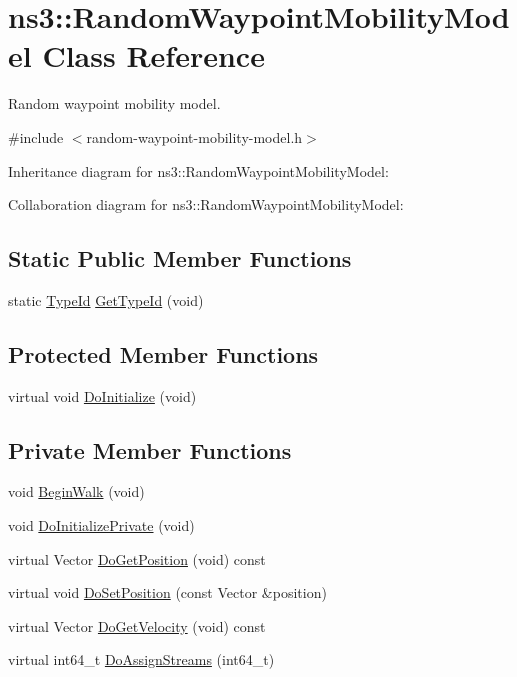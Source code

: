 \hypertarget{classns3_1_1RandomWaypointMobilityModel}{}\section{ns3\+:\+:Random\+Waypoint\+Mobility\+Model Class Reference}
\label{classns3_1_1RandomWaypointMobilityModel}


Random waypoint mobility model.  




{\ttfamily \#include $<$random-\/waypoint-\/mobility-\/model.\+h$>$}



Inheritance diagram for ns3\+:\+:Random\+Waypoint\+Mobility\+Model\+:


Collaboration diagram for ns3\+:\+:Random\+Waypoint\+Mobility\+Model\+:
\subsection*{Static Public Member Functions}
\begin{DoxyCompactItemize}
\item 
static \hyperlink{classns3_1_1TypeId}{Type\+Id} \hyperlink{classns3_1_1RandomWaypointMobilityModel_ac5dd2a5c630655400f1a0f49c91f2dbc}{Get\+Type\+Id} (void)
\end{DoxyCompactItemize}
\subsection*{Protected Member Functions}
\begin{DoxyCompactItemize}
\item 
virtual void \hyperlink{classns3_1_1RandomWaypointMobilityModel_ab3c24223f92f3b81d9b9b3d916e57808}{Do\+Initialize} (void)
\end{DoxyCompactItemize}
\subsection*{Private Member Functions}
\begin{DoxyCompactItemize}
\item 
void \hyperlink{classns3_1_1RandomWaypointMobilityModel_a2bdd46473a659a69038bd71efe730c0f}{Begin\+Walk} (void)
\item 
void \hyperlink{classns3_1_1RandomWaypointMobilityModel_a54eb8b2d814d3dfe78f5b189d1e40cf8}{Do\+Initialize\+Private} (void)
\item 
virtual Vector \hyperlink{classns3_1_1RandomWaypointMobilityModel_af33383b21bfeb2e69e1575034c737dc5}{Do\+Get\+Position} (void) const 
\item 
virtual void \hyperlink{classns3_1_1RandomWaypointMobilityModel_aaa7ec1c8816486310082042724e3d76b}{Do\+Set\+Position} (const Vector \&position)
\item 
virtual Vector \hyperlink{classns3_1_1RandomWaypointMobilityModel_a8570979b4af77043df70407f1d191baf}{Do\+Get\+Velocity} (void) const 
\item 
virtual int64\+\_\+t \hyperlink{classns3_1_1RandomWaypointMobilityModel_a3e119d88e301546b51489c06863f9fcc}{Do\+Assign\+Streams} (int64\+\_\+t)
\end{DoxyCompactItemize}
